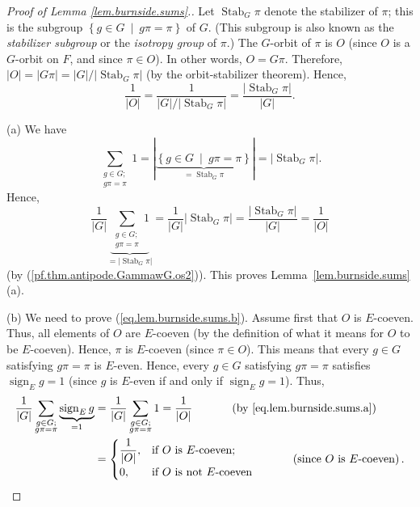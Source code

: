 \documentclass[12pt]{article}
\theoremstyle{plain}
\theoremstyle{definition}
\theoremstyle{remark}
\let\sumnonlimits\sum
\renewcommand{\sum}{\sumnonlimits\limits}
\newcommand{\sign}{\operatorname{sign}}
\newcommand{\Stab}{\operatorname{Stab}}
\begin{document}
\begin{proof}
[Proof of Lemma \ref{lem.burnside.sums}.] Let $\Stab_{G}\pi$
denote the stabilizer of $\pi$; this is the subgroup \newline
$\left\{  g\in
G\ \mid\ g\pi=\pi\right\}  $ of $G$. (This subgroup is also known as
the \textit{stabilizer subgroup} or the \textit{isotropy group} of
$\pi$.) The $G$-orbit of $\pi$ is $O$ (since $O$
is a $G$-orbit on $F$, and since $\pi\in O$). In other words, $O = G\pi$.
Therefore,
$\left\vert O\right\vert =\left\vert G\pi\right\vert
= \left\vert G\right\vert / \left\vert \Stab_G \pi \right\vert$
(by the orbit-stabilizer theorem). Hence,
\begin{equation}
\dfrac{1}{\left\vert O\right\vert }
= \dfrac{1}{\left\vert G\right\vert / \left\vert \Stab_G \pi \right\vert}
= \dfrac{\left\vert \Stab_G \pi \right\vert}{\left\vert G\right\vert}
.
\label{pf.thm.antipode.GammawG.os2}
\end{equation}


(a) We have%
\[
\sum_{\substack{g\in G;\\g\pi=\pi}}1=\left\vert \underbrace{\left\{  g\in
G\ \mid\ g\pi=\pi\right\}  }_{= \Stab_G \pi
}\right\vert =\left\vert  \Stab_G \pi\right\vert .
\]
Hence,
\[
\dfrac{1}{\left\vert G\right\vert }
\underbrace{\sum_{\substack{g \in G;\\ g \pi = \pi}} 1}_{
 = \left\vert \Stab_G \pi \right\vert}
= \dfrac{1}{\left\vert G\right\vert }
\left\vert \Stab_G \pi \right\vert
= \dfrac{\left\vert \Stab_G \pi \right\vert }{
\left\vert G\right\vert }
= \dfrac{1}{\left\vert O\right\vert }
\]
(by (\ref{pf.thm.antipode.GammawG.os2})). This proves
Lemma~\ref{lem.burnside.sums} (a).

(b) We need to prove (\ref{eq.lem.burnside.sums.b}). Assume first that $O$ is
$E$-coeven. Thus, all elements of $O$ are $E$-coeven (by the
definition of what it means for
$O$ to be $E$-coeven). Hence, $\pi$ is $E$-coeven (since $\pi \in O$).
This means that every $g\in G$ satisfying $g\pi=\pi$ is
$E$-even. Hence, every $g\in G$ satisfying $g\pi=\pi$ satisfies
$\sign_E g = 1$ (since $g$ is $E$-even if and only if
$\sign_E g = 1$). Thus,
\begin{align*}
\dfrac{1}{\left\vert G\right\vert }\sum_{\substack{g\in G;\\g\pi=\pi
}}\underbrace{\sign_E g}_{=1} &  =\dfrac
{1}{\left\vert G\right\vert }\sum_{\substack{g\in G;\\g\pi=\pi}}1=\dfrac
{1}{\left\vert O\right\vert }\ \ \ \ \ \ \ \ \ \ \left(  \text{by
\eqref{eq.lem.burnside.sums.a}}\right)  \\
&  =%
\begin{cases}
\dfrac{1}{\left\vert O\right\vert }, & \text{if }O\text{ is }E\text{-coeven}%
;\\
0, & \text{if }O\text{ is not }E\text{-coeven}%
\end{cases}
\ \ \ \ \ \ \ \ \ \ \left(  \text{since }O\text{ is }E\text{-coeven}\right)  .
\end{align*}



\end{proof}
\end{document}
